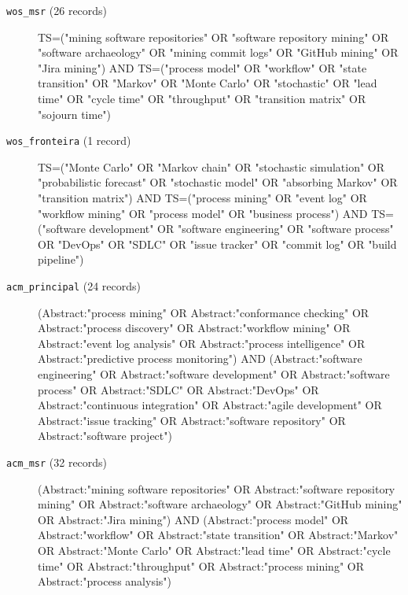 \begin{description}
\item[\texttt{wos\_msr} (26 records)]{\footnotesize\ttfamily\raggedright
TS=("mining software repositories" OR "software repository mining" OR "software archaeology" OR "mining commit logs" OR "GitHub mining" OR "Jira mining") AND TS=("process model" OR "workflow" OR "state transition" OR "Markov" OR "Monte Carlo" OR "stochastic" OR "lead time" OR "cycle time" OR "throughput" OR "transition matrix" OR "sojourn time")\par}

\item[\texttt{wos\_fronteira} (1 record)]{\footnotesize\ttfamily\raggedright
TS=("Monte Carlo" OR "Markov chain" OR "stochastic simulation" OR "probabilistic forecast" OR "stochastic model" OR "absorbing Markov" OR "transition matrix") AND TS=("process mining" OR "event log" OR "workflow mining" OR "process model" OR "business process") AND TS=("software development" OR "software engineering" OR "software process" OR "DevOps" OR "SDLC" OR "issue tracker" OR "commit log" OR "build pipeline")\par}

\item[\texttt{acm\_principal} (24 records)]{\footnotesize\ttfamily\raggedright
(Abstract:"process mining" OR Abstract:"conformance checking" OR Abstract:"process discovery" OR Abstract:"workflow mining" OR Abstract:"event log analysis" OR Abstract:"process intelligence" OR Abstract:"predictive process monitoring") AND (Abstract:"software engineering" OR Abstract:"software development" OR Abstract:"software process" OR Abstract:"SDLC" OR Abstract:"DevOps" OR Abstract:"continuous integration" OR Abstract:"agile development" OR Abstract:"issue tracking" OR Abstract:"software repository" OR Abstract:"software project")\par}

\item[\texttt{acm\_msr} (32 records)]{\footnotesize\ttfamily\raggedright
(Abstract:"mining software repositories" OR Abstract:"software repository mining" OR Abstract:"software archaeology" OR Abstract:"GitHub mining" OR Abstract:"Jira mining") AND (Abstract:"process model" OR Abstract:"workflow" OR Abstract:"state transition" OR Abstract:"Markov" OR Abstract:"Monte Carlo" OR Abstract:"lead time" OR Abstract:"cycle time" OR Abstract:"throughput" OR Abstract:"process mining" OR Abstract:"process analysis")\par}
\end{description}

